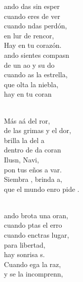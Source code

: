 \documentclass[12pt]{article}
\begin{document}
\begin{multicols*}{2}
\begin{cancion}%
	ando das sin esper\\
	cuando eres de ver\\
	cuando ndas perdón,\\
	en lur de rencor,\\
	Hay  en tu corazón.\\
	ando sientes compasn\\
	de un ao y su do\\
	cuando as la estrella,\\
	que olta la niebla,\\
	hay  en tu coran\\\jump\\
	\begin{chorus}%
	Más aá del ror,\\
	de las grimas y el dor, \\
	brilla la  del a\\
	dentro de da coran\\
	Ilusn, Navi, \\
	pon tus eños a var.\\
	Siembra , brinda a,\\
	que el mundo enro pide .\\
	\end{chorus}%
	\jump\\
	ando brota una oran, \\
	cuando ptas el erro\\
	cuando enctras lugar,\\
	para  libertad,\\
	hay  sonrisa s.\\
	Cuando ega la raz,\\
	y se la incomprenn,\\

\end{cancion}
\end{multicols*}
\end{document}
